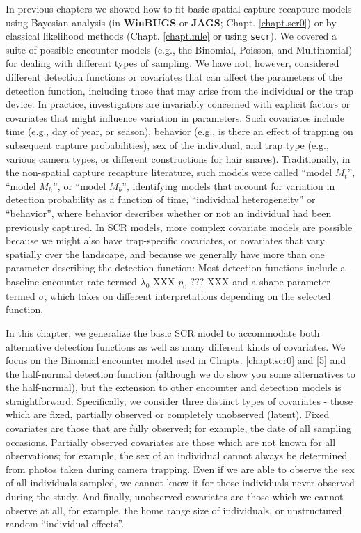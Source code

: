 In previous chapters we showed how to fit basic spatial
capture-recapture models using Bayesian analysis (in {\bf WinBUGS} or
{\bf JAGS};
Chapt. \ref{chapt.scr0}) or by classical likelihood methods
(Chapt. \ref{chapt.mle} or using \mbox{\tt secr}). We covered a suite of possible encounter models
(e.g., the Binomial, Poisson, and Multinomial) for
dealing with different types of sampling. We have not, however,
considered different detection functions or covariates that can affect
the parameters of the detection function, including those that may
arise from the individual or the trap device. In practice, 
investigators are invariably concerned
with explicit factors or covariates that might influence variation in
parameters. Such covariates
include time (e.g., day of year, or season), behavior (e.g., is there an 
effect of trapping on subsequent capture probabilities), sex of the individual, and trap
type (e.g., various camera types, or different constructions for hair
snares). Traditionally, in the non-spatial capture recapture
literature, such models were called ``model $M_t$'', ``model
$M_h$'', or ``model $M_b$'', identifying models that account for
variation in detection probability as a function of time, ``individual
heterogeneity'' or ``behavior'', where behavior describes
whether or not an individual had been previously captured. In SCR
models, more complex covariate models are possible because we might
also have trap-specific covariates, or covariates that vary spatially
over the landscape, and because we generally have more than one 
parameter describing the detection function:
Most detection functions include a baseline encounter
rate termed $\lambda_0$ XXX $p_0$ ??? XXX and a shape parameter
termed $\sigma$, which takes on different interpretations depending on
the selected function. 


In this chapter, we generalize the basic SCR model to accommodate both 
alternative detection functions as well as
many different kinds of covariates. We focus on the Binomial encounter
model used in Chapts. \ref{chapt.scr0} and \ref{5} and the half-normal 
detection function (although we do show you some alternatives to the half-normal),
but the extension to other encounter and detection models is
straightforward.  Specifically, we consider three distinct types of
covariates - those which are fixed, partially observed or completely
unobserved (latent).  Fixed covariates are those that are fully
observed; for example, the date of all sampling occasions.  Partially
observed covariates are those which are not known for all
observations; for example, the sex of an individual cannot always be
determined from photos taken during camera trapping.  Even if we are
able to observe the sex of all individuals sampled, we cannot know it
for those individuals never observed during the study.  And finally,
unobserved covariates are those which we cannot observe at all, for
example, the home range size of individuals, or unstructured random
``individual effects''.


